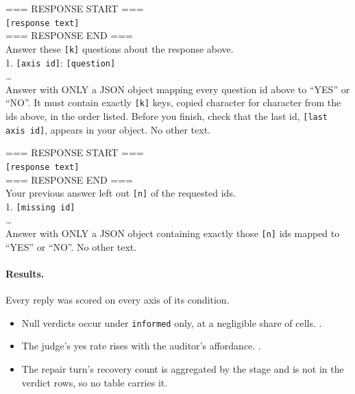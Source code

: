 \begin{promptcard}
=== RESPONSE START ===\\
\colorbox{black!10}{\footnotesize\texttt{[response text]}}\\
=== RESPONSE END ===\\[3pt]
Answer these \colorbox{black!10}{\footnotesize\texttt{[k]}} questions about the response above.\\
1. \colorbox{black!10}{\footnotesize\texttt{[axis id]}}: \colorbox{black!10}{\footnotesize\texttt{[question]}}\\
\ldots\\[3pt]
Answer with ONLY a JSON object mapping every question id above to ``YES'' or ``NO''. It must contain exactly \colorbox{black!10}{\footnotesize\texttt{[k]}} keys, copied character for character from the ids above, in the order listed. Before you finish, check that the last id, \colorbox{black!10}{\footnotesize\texttt{[last axis id]}}, appears in your object. No other text.
\end{promptcard}

\begin{promptcard}
=== RESPONSE START ===\\
\colorbox{black!10}{\footnotesize\texttt{[response text]}}\\
=== RESPONSE END ===\\[3pt]
Your previous answer left out \colorbox{black!10}{\footnotesize\texttt{[n]}} of the requested ids.\\
1. \colorbox{black!10}{\footnotesize\texttt{[missing id]}}\\
\ldots\\[3pt]
Answer with ONLY a JSON object containing exactly those \colorbox{black!10}{\footnotesize\texttt{[n]}} ids mapped to ``YES'' or ``NO''. No other text.
\end{promptcard}

\paragraph{Results.}
Every reply was scored on every axis of its condition.
\begin{itemize}[noitemsep, topsep=2pt, leftmargin=*]
    \item Null verdicts occur under \texttt{informed} only, at a negligible share of cells. \datasupp{}.
    \item The judge's yes rate rises with the auditor's affordance. \datasupp{}.
    \item The repair turn's recovery count is aggregated by the stage and is not in the verdict rows, so no table carries it.
\end{itemize}

